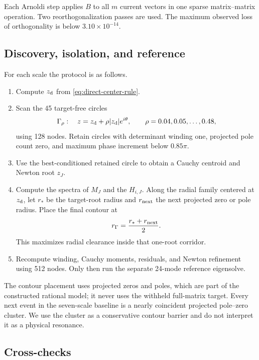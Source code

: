 \documentclass[11pt]{article}
\theoremstyle{definition}
\theoremstyle{remark}
\begin{document}
Each Arnoldi step applies $B$ to all $m$ current vectors in one sparse
matrix--matrix operation.  Two reorthogonalization passes are used.  The
maximum observed loss of orthogonality is below $3.10\times10^{-14}$.

\subsection{Discovery, isolation, and reference}
\label{sec:discovery-protocol}

For each scale the protocol is as follows.

\begin{enumerate}
 \item Compute $z_{\rm d}$ from \cref{eq:direct-center-rule}.
 \item Scan the 45 target-free circles
 \[
  \Gamma_\rho:\quad z=z_{\rm d}+\rho|z_{\rm d}|e^{i\theta},
  \qquad \rho=0.04,0.05,\ldots,0.48,
 \]
 using 128 nodes.  Retain circles with determinant winding one, projected
 pole count zero, and maximum phase increment below $0.85\pi$.
 \item Use the best-conditioned retained circle to obtain a Cauchy centroid
 and Newton root $z_J$.
 \item Compute the spectra of $M_J$ and the $H_{i,J}$.  Along the radial
 family centered at $z_{\rm d}$, let $r_*$ be the target-root radius and
 $r_{\rm next}$ the next projected zero or pole radius.  Place the final
 contour at
 \begin{equation}
  r_\Gamma=\frac{r_*+r_{\rm next}}{2}.
  \label{eq:mid-corridor}
 \end{equation}
 This maximizes radial clearance inside that one-root corridor.
 \item Recompute winding, Cauchy moments, residuals, and Newton refinement
 using 512 nodes.  Only then run the separate 24-mode reference eigensolve.
\end{enumerate}

The contour placement uses projected zeros and poles, which are part of the
constructed rational model; it never uses the withheld full-matrix target.
Every next event in the seven-scale baseline is a nearly coincident
projected pole--zero cluster.  We use the cluster as a conservative contour
barrier and do not interpret it as a physical resonance.

\subsection{Cross-checks}
\end{document}
